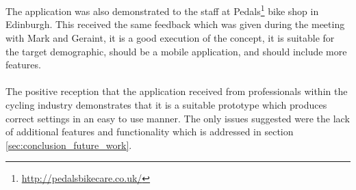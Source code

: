 			\\\\
			The application was also demonstrated to the staff at Pedals\footnote{\url{http://pedalsbikecare.co.uk/}} bike shop in Edinburgh. This received the same feedback which was given during the meeting with Mark and Geraint, it is a good execution of the concept, it is suitable for the target demographic, should be a mobile application, and should include more features.
			\\\\
			The positive reception that the application received from professionals within the cycling industry demonstrates that it is a suitable prototype which produces correct settings in an easy to use manner. The only issues suggested were the lack of additional features and functionality which is addressed in section \ref{sec:conclusion_future_work}.